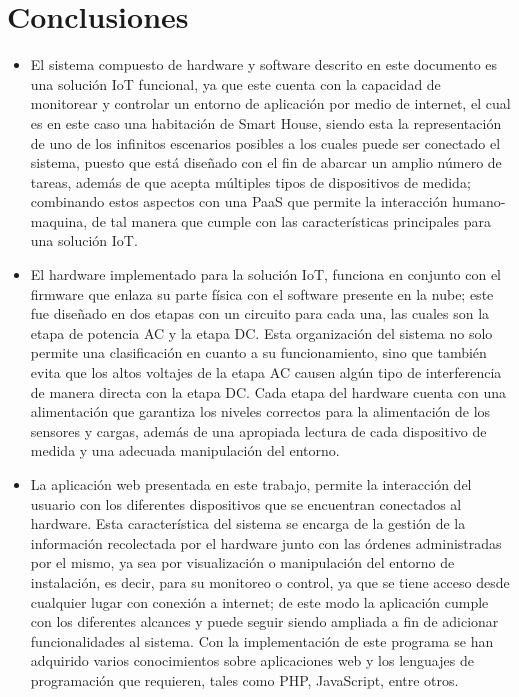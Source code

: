 \section{Conclusiones}

\begin{itemize}
	\item El sistema compuesto de hardware y software descrito en este documento es una solución IoT funcional, ya que este cuenta con la capacidad de monitorear y controlar un entorno de aplicación por medio de internet, el cual es en este caso una habitación de Smart House, siendo esta la representación de uno de los infinitos escenarios posibles a los cuales puede ser conectado el sistema, puesto que está diseñado con el fin de abarcar un amplio número de tareas, además de que acepta múltiples tipos de dispositivos de medida; combinando estos aspectos con una PaaS que permite la interacción humano-maquina, de tal manera que cumple con las características principales para una solución IoT.\\
	
	
	\item El hardware implementado para la solución IoT, funciona en conjunto con el firmware que enlaza su parte física con el software presente en la nube; este fue diseñado en dos etapas con un circuito para cada una, las cuales son la etapa de potencia AC y la etapa DC. Esta organización del sistema no solo permite una clasificación en cuanto a su funcionamiento, sino que también evita que los altos voltajes de la etapa AC causen algún tipo de interferencia de manera directa con la etapa DC. Cada etapa del hardware cuenta con una alimentación que garantiza los niveles correctos para la alimentación de los sensores y cargas, además de una apropiada lectura de cada dispositivo de medida y una adecuada manipulación del entorno.\\
	
	\item La aplicación web presentada en este trabajo, permite la interacción del usuario con los diferentes dispositivos que se encuentran conectados al hardware. Esta característica del sistema se encarga de la gestión de la información recolectada por el hardware junto con las órdenes administradas por el mismo, ya sea por visualización o manipulación del entorno de instalación, es decir, para su monitoreo o control, ya que se tiene acceso desde cualquier lugar con conexión a internet; de este modo la aplicación cumple con los diferentes alcances y puede seguir siendo ampliada a fin de adicionar funcionalidades al sistema. Con la implementación de este programa se han adquirido varios conocimientos sobre aplicaciones web y los lenguajes de programación que requieren, tales como PHP, JavaScript, entre otros.\\
	

\end{itemize}
